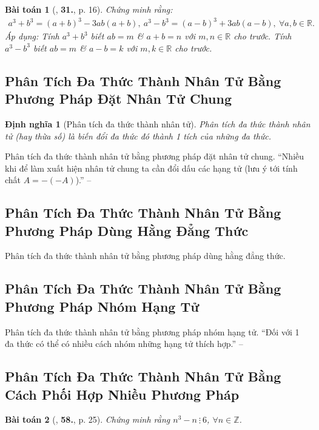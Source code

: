 \documentclass{article}
\numberwithin{equation}{section}
\newtheorem{dinhnghia}{Định nghĩa}[section]
\newtheorem{baitoan}{Bài toán}[section]
\begin{document}
\begin{baitoan}[\cite{SGK_Toan_8_tap_1}, \textbf{31.}, p. 16]
	Chứng minh rằng:
	\begin{align*}
		a^3 + b^3 = (a + b)^3 - 3ab(a + b),\ a^3 - b^3 = (a - b)^3 + 3ab(a - b),\ \forall a,b\in\mathbb{R}.
	\end{align*}
	Áp dụng: Tính $a^3 + b^3$ biết $ab = m$ \& $a + b = n$ với $m,n\in\mathbb{R}$ cho trước. Tính $a^3 - b^3$ biết $ab = m$ \& $a - b = k$ với $m,k\in\mathbb{R}$ cho trước.
\end{baitoan}

\subsection{Phân Tích Đa Thức Thành Nhân Tử Bằng Phương Pháp Đặt Nhân Tử Chung}

\begin{dinhnghia}[Phân tích đa thức thành nhân tử]
	\emph{Phân tích đa thức thành nhân tử (hay thừa số)} là biến đổi đa thức đó thành 1 tích của những đa thức.	
\end{dinhnghia}
Phân tích đa thức thành nhân tử bằng phương pháp đặt nhân tử chung. ``Nhiều khi để làm xuất hiện nhân tử chung ta cần đổi dấu các hạng tử (lưu ý tới tính chất $A = -(-A)$).'' -- \cite[p. 18]{SGK_Toan_8_tap_1}

\subsection{Phân Tích Đa Thức Thành Nhân Tử Bằng Phương Pháp Dùng Hằng Đẳng Thức}
Phân tích đa thức thành nhân tử bằng phương pháp dùng hằng đẳng thức.

\subsection{Phân Tích Đa Thức Thành Nhân Tử Bằng Phương Pháp Nhóm Hạng Tử}
Phân tích đa thức thành nhân tử bằng phương pháp nhóm hạng tử. ``Đối với 1 đa thức có thể có nhiều cách nhóm những hạng tử thích hợp.'' -- \cite[p. 21]{SGK_Toan_8_tap_1}

\subsection{Phân Tích Đa Thức Thành Nhân Tử Bằng Cách Phối Hợp Nhiều Phương Pháp}

\begin{baitoan}[\cite{SGK_Toan_8_tap_1}, \textbf{58.}, p. 25]
	Chứng minh rằng $n^3 - n\ \vdots\ 6$, $\forall n\in\mathbb{Z}$.
\end{baitoan}
\end{document}
